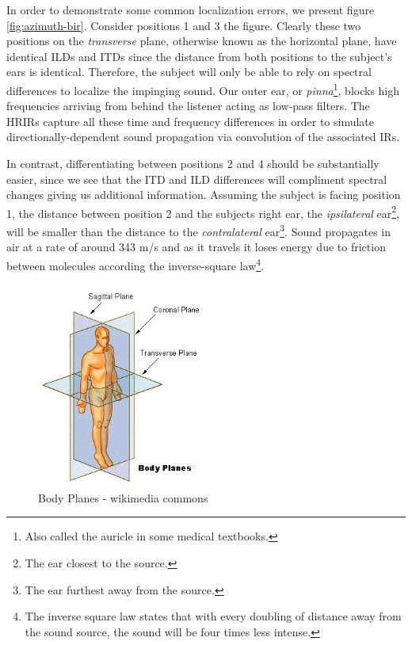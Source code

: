 In order to demonstrate some common localization errors, we present figure \ref{fig:azimuth-bir}. Consider positions 1 and 3 the figure. Clearly these two positions on the \textit{transverse} plane, otherwise known as the horizontal plane, have identical ILDs and ITDs since the distance from both positions to the subject's ears is identical. Therefore, the subject will only be able to rely on spectral differences to localize the impinging sound. Our outer ear, or \textit{pinna}\footnote{Also called the auricle in some medical textbooks.}, blocks high frequencies arriving from behind the listener acting as low-pass filters. The HRIRs capture all these time and frequency differences in order to simulate directionally-dependent sound propagation via convolution of the associated IRs. 

In contrast, differentiating between positions 2 and 4 should be substantially easier, since we see that the ITD and ILD differences will compliment spectral changes giving us additional information. Assuming the subject is facing position 1, the distance between position 2 and the subjects right ear, the \textit{ipsilateral} ear\footnote{The ear closest to the source.}, will be smaller than the distance to the \textit{contralateral} ear\footnote{The ear furthest away from the source.}. Sound propagates in air at a rate of around 343 m/s and as it travels it loses energy due to friction between molecules according the inverse-square law\footnote{The inverse square law states that with every doubling of distance away from the sound source, the sound will be four times less intense.}. 

\begin{figure}[ht!]%
\centering
\includegraphics[width=0.5\textwidth]{img/body-planes.jpg}
\caption{Body Planes - wikimedia commons}
\label{fig:body-planes}
\end{figure}


